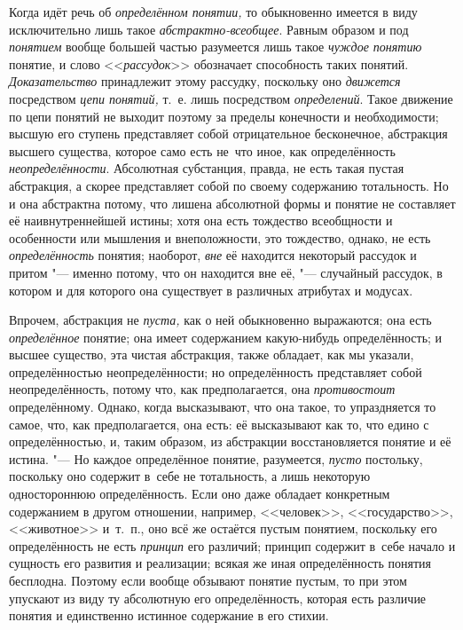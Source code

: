 Когда идёт речь об {\em определённом понятии,}
то обыкновенно имеется в виду исключительно лишь такое
{\em абстрактно-всеобщее}. Равным образом и под
{\em понятием} вообще большей частью разумеется лишь такое
{\em чуждое понятию} понятие, и слово <<{\em рассудок}>>
обозначает способность таких понятий. {\em Доказательство}
принадлежит этому рассудку, поскольку оно {\em движется}
посредством {\em цепи понятий,} т.~е. лишь посредством {\em определений}.
Такое движение по цепи понятий не выходит поэтому за пределы конечности и
необходимости; высшую его ступень представляет собой отрицательное
бесконечное, абстракция высшего существа, которое само есть не~что иное,
как определённость {\em неопределённости}.
Абсолютная субстанция, правда, не есть такая пустая
абстракция, а скорее представляет собой по своему содержанию тотальность.
Но и она абстрактна потому, что лишена абсолютной формы и понятие не
составляет её наивнутреннейшей истины; хотя она есть тождество всеобщности
и особенности или мышления и внеположности, это тождество,
однако, не есть {\em определённость} понятия; наоборот, {\em вне} её находится
некоторый рассудок и притом "--- именно потому, что он
находится вне её, "--- случайный рассудок, в котором и для
которого она существует в различных атрибутах и
модусах.

Впрочем, абстракция не {\em пуста,} как о ней
обыкновенно выражаются; она есть {\em определённое}
понятие; она имеет содержанием какую-нибудь определённость; и
высшее существо, эта чистая абстракция, также обладает, как мы указали,
определённостью неопределённости; но определённость представляет собой
неопределённость, потому что, как предполагается, она {\em противостоит}
определённому. Однако, когда высказывают, что она такое, то
упраздняется то самое, что, как предполагается, она есть: её высказывают
как то, что едино с определённостью, и, таким образом, из абстракции
восстановляется понятие и её истина. "--- Но каждое
определённое понятие, разумеется, {\em пусто} постольку,
поскольку оно содержит в~себе не тотальность, а лишь некоторую одностороннюю
определённость. Если оно даже обладает конкретным содержанием в другом
отношении, например, <<человек>>, <<государство>>, <<животное>> и~т.~п.,
оно всё же остаётся пустым понятием, поскольку его определённость не есть
{\em принцип} его различий; принцип содержит в~себе начало и сущность его
развития и реализации; всякая же иная определённость понятия бесплодна. Поэтому
если вообще обзывают понятие пустым, то при этом упускают из виду ту абсолютную
его определённость, которая есть различие понятия и единственно истинное
содержание в его стихии.

